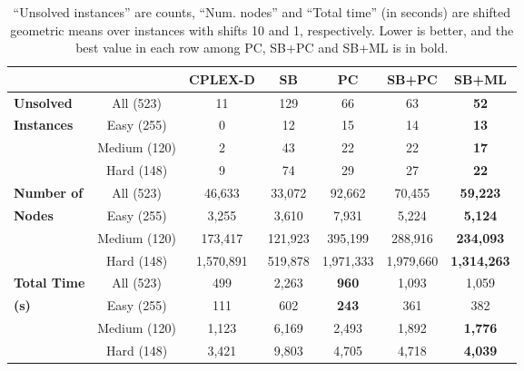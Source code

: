 \begin{table*}[htb!]
    \centering
    \begin{tabular}{|l c c c| c c c|}
        \hline
        \textbf{} & {} & \textbf{CPLEX-D} & \textbf{SB} & \textbf{PC} & \textbf{SB+PC} & \textbf{SB+ML}\\
        \hline
        \quad \textbf{Unsolved} & All (523) & 11 & 129 & 66 & 63 & \textbf{52} \\
        \quad \textbf{Instances} & Easy (255) & 0 & 12 & 15 & 14 & \textbf{13} \\
        \quad & Medium (120) & 2 & 43 & 22 & 22 & \textbf{17} \\
        \quad & Hard (148) & 9 & 74 & 29 & 27 & \textbf{22} \\
        \hline
        \quad \textbf{Number of} & All (523) & 46,633 & 33,072 & 92,662 & 70,455 & \textbf{59,223} \\
        \quad \textbf{Nodes} & Easy (255) & 3,255 & 3,610 & 7,931 & 5,224 & \textbf{5,124} \\
        \quad & Medium (120) & 173,417 & 121,923 & 395,199 & 288,916 & \textbf{234,093} \\
        \quad & Hard (148) & 1,570,891 & 519,878 & 1,971,333 & 1,979,660 & \textbf{1,314,263} \\
        \hline
        \quad \textbf{Total Time} & All (523) & 499 & 2,263 & \textbf{960} & 1,093 & 1,059 \\
        \quad \textbf{(s)} & Easy (255) & 111 & 602 & \textbf{243} & 361 & 382 \\
        \quad & Medium (120) & 1,123 & 6,169 & 2,493 & 1,892 & \textbf{1,776} \\
        \quad & Hard (148) & 3,421 & 9,803 & 4,705 & 4,718 & \textbf{4,039} \\
        \hline
    \end{tabular}
    \caption{“Unsolved instances” are counts, “Num. nodes” and “Total time” (in seconds) are shifted geometric means over instances with shifts 10 and 1, respectively.
    Lower is better, and the best value in each row among PC, SB+PC and SB+ML is in bold.}
    \label{tab:khalil-results}
\end{table*}
